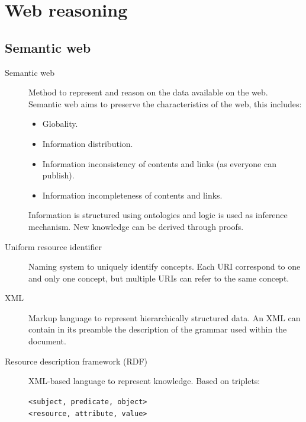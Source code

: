 \chapter{Web reasoning}


\section{Semantic web}

\begin{description}
    \item[Semantic web] 
        Method to represent and reason on the data available on the web.
        Semantic web aims to preserve the characteristics of the web, this includes:
        \begin{itemize}
            \item Globality.
            \item Information distribution.
            \item Information inconsistency of contents and links (as everyone can publish).
            \item Information incompleteness of contents and links.
        \end{itemize}

        Information is structured using ontologies and logic is used as inference mechanism.
        New knowledge can be derived through proofs.

    \item[Uniform resource identifier] 
        Naming system to uniquely identify concepts.
        Each URI correspond to one and only one concept, but multiple URIs can refer to the same concept.

    \item[XML] 
        Markup language to represent hierarchically structured data.
        An XML can contain in its preamble the description of the grammar used within the document.

    \item[Resource description framework (RDF)] 
        XML-based language to represent knowledge.
        Based on triplets:
        \begin{center}
            \texttt{<subject, predicate, object>}\\
            \texttt{<resource, attribute, value>}
        \end{center}


\end{description}
